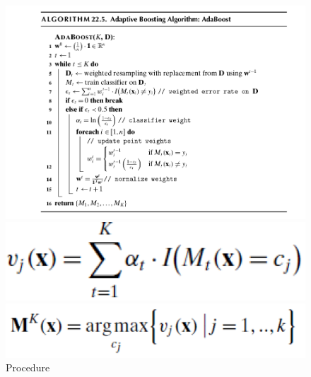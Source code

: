 \begin{itemize}
\begin{figure}[H]
    \centering
    \begin{minipage}{0.9\textwidth}
        \centering
        \includegraphics[width=\textwidth]{Figures/adaboost.png} %
        \caption{Procedure}
    \end{minipage}\hfill
    \begin{minipage}{0.4\textwidth}
        \centering
        \includegraphics[width=\textwidth]{Figures/adaboost3.png} %
    \end{minipage}
        \begin{minipage}{0.4\textwidth}
        \centering
        \includegraphics[width=\textwidth]{Figures/adaboost4.png} %
    \end{minipage}
\end{figure}
\begin{figure}[H]

\end{figure}
\end{itemize}
